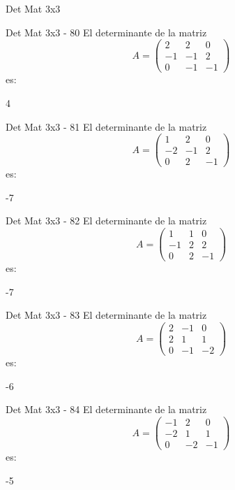 \documentclass[a4,11pt]{aleph-notas}
\begin{document}
\begin{quiz}{Det Mat 3x3}
\begin{numerical}[tolerance=0]%
    {Det Mat 3x3 - 80}
    El determinante de la matriz
    \[
        A = \begin{pmatrix} 2 & 2 & 0 \\ -1 & -1 & 2 \\ 0 & -1 & -1 \end{pmatrix}
    \]
    es:
    \item[] 4
\end{numerical}

\begin{numerical}[tolerance=0]%
    {Det Mat 3x3 - 81}
    El determinante de la matriz
    \[
        A = \begin{pmatrix} 1 & 2 & 0 \\ -2 & -1 & 2 \\ 0 & 2 & -1 \end{pmatrix}
    \]
    es:
    \item[] -7
\end{numerical}

\begin{numerical}[tolerance=0]%
    {Det Mat 3x3 - 82}
    El determinante de la matriz
    \[
        A = \begin{pmatrix} 1 & 1 & 0 \\ -1 & 2 & 2 \\ 0 & 2 & -1 \end{pmatrix}
    \]
    es:
    \item[] -7
\end{numerical}

\begin{numerical}[tolerance=0]%
    {Det Mat 3x3 - 83}
    El determinante de la matriz
    \[
        A = \begin{pmatrix} 2 & -1 & 0 \\ 2 & 1 & 1 \\ 0 & -1 & -2 \end{pmatrix}
    \]
    es:
    \item[] -6
\end{numerical}

\begin{numerical}[tolerance=0]%
    {Det Mat 3x3 - 84}
    El determinante de la matriz
    \[
        A = \begin{pmatrix} -1 & 2 & 0 \\ -2 & 1 & 1 \\ 0 & -2 & -1 \end{pmatrix}
    \]
    es:
    \item[] -5
\end{numerical}


\end{quiz}
\end{document}
